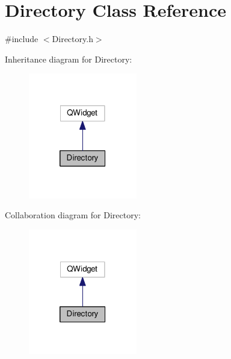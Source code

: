 \hypertarget{class_directory}{\section{Directory Class Reference}
\label{class_directory}
}


{\ttfamily \#include $<$Directory.\-h$>$}



Inheritance diagram for Directory\-:\nopagebreak
\begin{figure}[H]
\begin{center}
\leavevmode
\includegraphics[width=134pt]{class_directory__inherit__graph}
\end{center}
\end{figure}


Collaboration diagram for Directory\-:\nopagebreak
\begin{figure}[H]
\begin{center}
\leavevmode
\includegraphics[width=134pt]{class_directory__coll__graph}
\end{center}
\end{figure}
